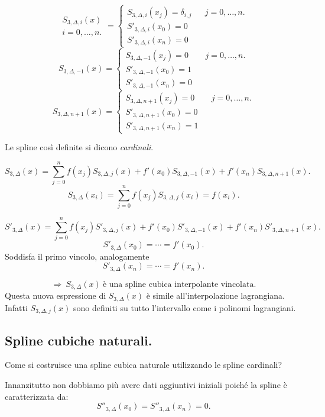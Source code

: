 \[
\begin{array}{c}S_{3,\Delta,i}(x) \\i = 0, \ldots, n. \end{array}= \left\{
\begin{array}{llr}
S_{3,\Delta,i}(x_j) = \delta_{i,j} & & j = 0, \ldots, n. \\
S'_{3,\Delta,i}(x_0) = 0 \\
S'_{3,\Delta,i}(x_n) = 0
\end{array}
\right.
\]
\[
S_{3,\Delta,-1}(x) = \left\{
\begin{array}{llr}
S_{3,\Delta,-1}(x_j) = 0 & & j = 0, \ldots, n. \\
S'_{3,\Delta,-1}(x_0) = 1 \\
S'_{3,\Delta,-1}(x_n) = 0
\end{array}
\right.
\]
\[
S_{3,\Delta,n+1}(x) = \left\{
\begin{array}{llr}
S_{3,\Delta,n+1}(x_j) = 0 & & j = 0, \ldots, n. \\
S'_{3,\Delta,n+1}(x_0) = 0 \\
S'_{3,\Delta,n+1}(x_n) = 1
\end{array}
\right.
\]

Le spline così definite si dicono \emph{cardinali}.

\[
S_{3,\Delta}(x) = \sum_{j=0}^nf(x_j)S_{3,\Delta,j}(x) + f'(x_0)S_{3,\Delta,-1}(x)
+f'(x_n)S_{3,\Delta,n+1}(x).
\]
\[
S_{3,\Delta}(x_i) = \sum_{j=0}^nf(x_j)S_{3,\Delta,j}(x_i) = f(x_i).
\]

\[
S'_{3,\Delta}(x) = \sum_{j=0}^nf(x_j)S'_{3,\Delta,j}(x) + f'(x_0)S'_{3,\Delta,-1}(x)
+f'(x_n)S'_{3,\Delta,n+1}(x).
\]
\[
S'_{3,\Delta}(x_0) =\cdots = f'(x_0).
\]
Soddisfa il primo vincolo, analogamente
\[
S'_{3,\Delta}(x_n) =\cdots = f'(x_n).
\]

\[
\Longrightarrow \ S_{3,\Delta}(x) \ \textrm{è una spline cubica interpolante
vincolata.}
\]
Questa nuova espressione di $S_{3,\Delta}(x)$ è simile all'interpolazione
lagrangiana. Infatti $S_{3,\Delta,j}(x)$ sono definiti su tutto l'intervallo
come i polinomi lagrangiani.

\subsection{Spline cubiche naturali.}
Come si costruisce una spline cubica naturale utilizzando le spline cardinali?

Innanzitutto non dobbiamo più avere dati aggiuntivi iniziali poiché la spline
è caratterizzata da:
\[
S''_{3,\Delta}(x_0) = S''_{3,\Delta}(x_n) = 0.
\]

